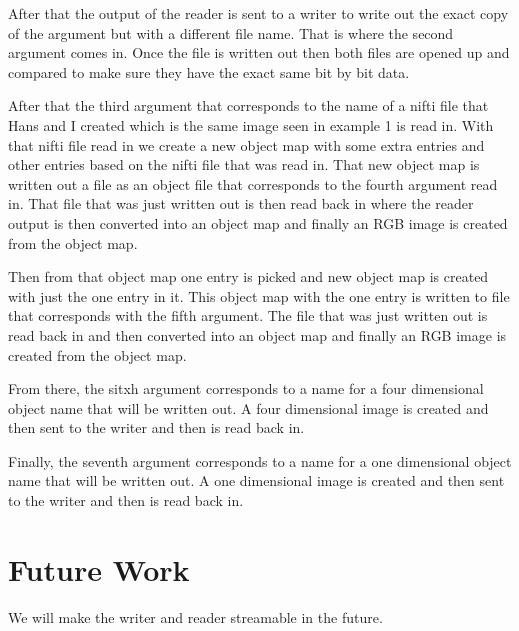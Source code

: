 \documentclass{InsightArticle}
\begin{document}
After that the output of the reader is sent to a writer to write out the exact copy of the argument but with a different file name.  That is where the second argument comes in.  Once the file is written out then both files are opened up and compared to make sure they have the exact same bit by bit data.  

After that the third argument that corresponds to the name of a nifti file that Hans and I created which is the same image seen in example 1 is read in.  With that nifti file read in we create a new object map with some extra entries and other entries based on the nifti file that was read in.  That new object map is written out a file as an object file that corresponds to the fourth argument read in.  That file that was just written out is then read back in where the reader output is then converted into an object map and finally an RGB image is created from the object map.  

Then from that object map one entry is picked and new object map is created with just the one entry in it.  This object map with the one entry is written to file that corresponds with the fifth argument.  The file that was just written out is read back in and then converted into an object map and finally an RGB image is created from the object map.

From there, the sitxh argument corresponds to a name for a four dimensional object name that will be written out.  A four dimensional image is created and then sent to the writer and then is read back in.

Finally, the seventh argument corresponds to a name for a one dimensional object name that will be written out.  A one dimensional image is created and then sent to the writer and then is read back in.

\section{Future Work}

We will make the writer and reader streamable in the future.


%
%



\end{document}
